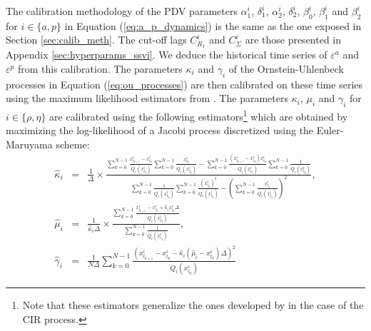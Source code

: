 The calibration methodology of the PDV parameters $\alpha_1^i$, $\delta_1^i$, $\alpha_2^i$, $\delta_2^i$, $\beta_0^i$, $\beta_1^i$ and $\beta_2^i$ for $i\in \{a,p\}$ in Equation (\ref{eq:a_p_dynamics}) is the same as the one exposed in Section \ref{sec:calib_meth}. The cut-off lags $C_{R_1}^i$ and $C_{\Sigma}^i$ are those presented in Appendix \ref{sec:hyperparams_ssvi}. We deduce the historical time series of $\varepsilon^a$ and $\varepsilon^p$ from this calibration. The parameters $\kappa_i$ and $\gamma_i$ of the Ornstein-Uhlenbeck processes in Equation (\ref{eq:ou_processes}) are then calibrated on these time series using the maximum likelihood estimators from \cite{tang2009parameter}. The parameters $\kappa_i$, $\mu_i$ and $\gamma_i$ for $i\in\{\rho,\eta\}$ are calibrated using the following estimators\footnote{Note that these estimators generalize the ones developed by \cite{wei2016} in the case of the CIR process. } which are obtained by maximizing the log-likelihood of a Jacobi process discretized using the Euler-Maruyama scheme: 
\begin{equation*}
    \begin{array}{rcl}
        \hat{\kappa}_i &=& \displaystyle\frac{1}{\Delta} \times \frac{
             \displaystyle\sum_{k=0}^{N-1} \frac{x^i_{t_{k+1}} - x^i_{t_k}}{Q_i\left(x^i_{t_k}\right)} 
             \displaystyle\sum_{k=0}^{N-1} \frac{x^i_{t_k}}{Q_i\left(x^i_{t_k}\right)}  
            - \displaystyle\sum_{k=0}^{N-1} \frac{(x^i_{t_{k+1}} - x^i_{t_k}) x^i_{t_k}}{Q_i\left(x^i_{t_k}\right)}
            \displaystyle\sum_{k=0}^{N-1} \frac{1}{Q_i\left(x^i_{t_k}\right)} 
            }{
            \displaystyle\sum_{k=0}^{N-1} \frac{1}{Q_i\left(x^i_{t_k}\right)}  
             \displaystyle\sum_{k=0}^{N-1} \frac{\left(x^i_{t_k}\right)^2}{Q_i\left(x^i_{t_k}\right)} 
            - \left( \displaystyle\sum_{k=0}^{N-1} \frac{x^i_{t_k}}{Q_i\left(x^i_{t_k}\right)} \right)^2
            },\\
    \hat{\mu}_i &=& \displaystyle\frac{1}{\hat{\kappa}_i\Delta} \times \frac{\displaystyle\sum_{k=0}^{N-1}\frac{x^i_{t_{k+1}}-x^i_{t_k}+\hat{\kappa}_i x^i_{t_k}\Delta}{Q_i\left(x^i_{t_k}\right)}}{\displaystyle\sum_{k=0}^{N-1}\frac{1}{Q_i\left(x^i_{t_k}\right)}}, \\
    \hat{\gamma}_i &=& \displaystyle\frac{1}{N\Delta} \displaystyle\sum_{k=0}^{N-1} \frac{
        \left( x^i_{t_{k+1}} - x^i_{t_k} - \hat{\kappa}_i \left( \hat{\mu}_i - x^i_{t_k} \right) \Delta \right)^2
        }{Q_i\left( x^i_{t_k} \right)}
    \end{array}
\end{equation*}
